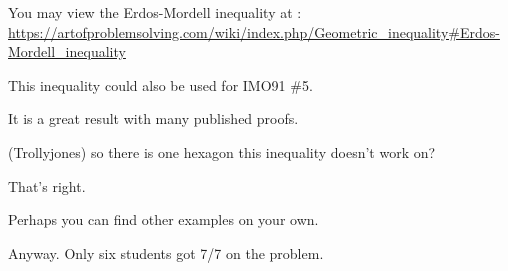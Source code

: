You may view the Erdos-Mordell inequality at : \url{https://artofproblemsolving.com/wiki/index.php/Geometric_inequality#Erdos-Mordell_inequality}

This inequality could also be used for IMO91 \#5.

It is a great result with many published proofs.

(Trollyjones) so there is one hexagon this inequality doesn't work on?

That's right.

Perhaps you can find other examples on your own. 

Anyway. Only six students got 7/7 on the problem.





